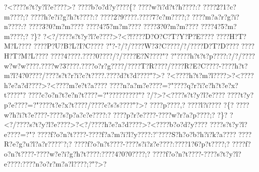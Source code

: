\documentclass[11pt, openany]{book}
\begin{document}
?\textless{}???\textbar{}?s?t?y?l?e???\textbar{}?\textgreater{}?
???\textbar{}?b?o?d?y???\textbar{}?\{?
???\textbar{}?w?i?d?t?h???\textbar{}?:?
???\textbar{}?2?1?c?m???\textbar{}?;?
???\textbar{}?h?e?i?g?h?t???\textbar{}?:?
???\textbar{}?2?9???\textbar{}?.???\textbar{}?7?c?m???\textbar{}?;?
???\textbar{}?m?a?r?g?i?n???\textbar{}?:?
???\textbar{}?3?0?m?m???\textbar{}? ???\textbar{}?4?5?m?m???\textbar{}?
???\textbar{}?3?0?m?m???\textbar{}?
???\textbar{}?4?5?m?m???\textbar{}?;? ?\}?
?\textless{}?/???\textbar{}?s?t?y?l?e???\textbar{}?\textgreater{}?\textless{}?!???\textbar{}?D?O?C?T?Y?P?E???\textbar{}?
???\textbar{}?H?T?M?L???\textbar{}?
???\textbar{}?P?U?B?L?I?C???\textbar{}?
?"?-?/?/???\textbar{}?W?3?C???\textbar{}?/?/???\textbar{}?D?T?D???\textbar{}?
???\textbar{}?H?T?M?L???\textbar{}?
???\textbar{}?4???\textbar{}?.???\textbar{}?0???\textbar{}?/?/???\textbar{}?E?N???\textbar{}?"?
?"???\textbar{}?h?t?t?p???\textbar{}?:?/?/???\textbar{}?w?w?w???\textbar{}?.???\textbar{}?w?3???\textbar{}?.???\textbar{}?o?r?g???\textbar{}?/???\textbar{}?T?R???\textbar{}?/???\textbar{}?R?E?C???\textbar{}?-???\textbar{}?h?t?m?l?4?0???\textbar{}?/???\textbar{}?s?t?r?i?c?t???\textbar{}?.???\textbar{}?d?t?d???\textbar{}?"?\textgreater{}?
?\textless{}???\textbar{}?h?t?m?l???\textbar{}?\textgreater{}?\textless{}???\textbar{}?h?e?a?d???\textbar{}?\textgreater{}?\textless{}???\textbar{}?m?e?t?a???\textbar{}?
???\textbar{}?n?a?m?e???\textbar{}?=?"???\textbar{}?q?r?i?c?h?t?e?x?t???\textbar{}?"?
???\textbar{}?c?o?n?t?e?n?t???\textbar{}?=?"???\textbar{}?????\textbar{}?"?
?/?\textgreater{}?\textless{}???\textbar{}?s?t?y?l?e???\textbar{}?
???\textbar{}?t?y?p?e???\textbar{}?=?"???\textbar{}?t?e?x?t???\textbar{}?/???\textbar{}?c?s?s???\textbar{}?"?\textgreater{}?
???\textbar{}?p???\textbar{}?,? ???\textbar{}?l?i???\textbar{}? ?\{?
???\textbar{}?w?h?i?t?e???\textbar{}?-???\textbar{}?s?p?a?c?e???\textbar{}?:?
???\textbar{}?p?r?e???\textbar{}?-???\textbar{}?w?r?a?p???\textbar{}?;?
?\}?
?\textless{}?/???\textbar{}?s?t?y?l?e???\textbar{}?\textgreater{}?\textless{}?/???\textbar{}?h?e?a?d???\textbar{}?\textgreater{}?\textless{}???\textbar{}?b?o?d?y???\textbar{}?
???\textbar{}?s?t?y?l?e???\textbar{}?=?"?
???\textbar{}?f?o?n?t???\textbar{}?-???\textbar{}?f?a?m?i?l?y???\textbar{}?:?'???\textbar{}?S?h?o?b?h?i?k?a???\textbar{}?
???\textbar{}?R?e?g?u?l?a?r???\textbar{}?'?;?
???\textbar{}?f?o?n?t???\textbar{}?-???\textbar{}?s?i?z?e???\textbar{}?:???\textbar{}?1?6?p?t???\textbar{}?;?
???\textbar{}?f?o?n?t???\textbar{}?-???\textbar{}?w?e?i?g?h?t???\textbar{}?:???\textbar{}?4?0?0???\textbar{}?;?
???\textbar{}?f?o?n?t???\textbar{}?-???\textbar{}?s?t?y?l?e???\textbar{}?:???\textbar{}?n?o?r?m?a?l???\textbar{}?;?"?\textgreater{}?
\end{document}
